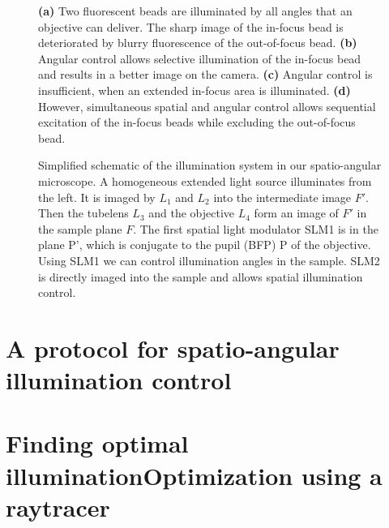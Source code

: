 \begin{figure}[!hbt]
  \centering
  \caption{{\bf (a)} Two fluorescent beads are illuminated by all
    angles that an objective can deliver. The sharp image of the
    in-focus bead is deteriorated by blurry fluorescence of the
    out-of-focus bead. {\bf (b)} Angular control allows selective
    illumination of the in-focus bead and results in a better image on
    the camera. {\bf (c)} Angular control is insufficient, when an
    extended in-focus area is illuminated. {\bf (d)} However,
    simultaneous spatial and angular control allows sequential
    excitation of the in-focus beads while excluding the out-of-focus
    bead.}
  \label{fig:hourglass-all}
\end{figure}



\begin{figure}[!hbt]
  \centering
  \caption{Simplified schematic of the illumination system in our
    spatio-angular microscope. A homogeneous extended light source
    illuminates from the left. It is imaged by $L_1$ and $L_2$ into
    the intermediate image $F'$. Then the tubelens $L_3$ and the
    objective $L_4$ form an image of $F'$ in the sample plane $F$. The
    first spatial light modulator SLM1 is in the plane P', which is
    conjugate to the pupil (BFP) P of the objective. Using SLM1 we can
    control illumination angles in the sample. SLM2 is directly imaged
    into the sample and allows spatial illumination
    control.} 
  \label{fig:memi-simple}
\end{figure}

\section{A protocol for spatio-angular illumination control}
\section{Finding optimal illuminationOptimization using a raytracer}
